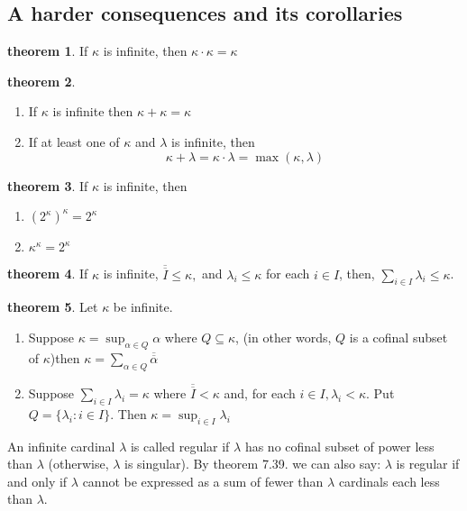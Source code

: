 \documentclass[a4paper,11pt]{article}%
\theoremstyle{remark}
\theoremstyle{definition}
\newtheorem{theorem}{theorem}[section]
\theoremstyle{definition}
\theoremstyle{plain}
\theoremstyle{definition}
\begin{document}
\subsection{A harder consequences and its corollaries}
\begin{theorem}
    If $\kappa$ is infinite, then $\kappa\cdot\kappa=\kappa$
\end{theorem}
\begin{theorem}
    \begin{enumerate}
        \item If $\kappa$ is infinite then $\kappa+\kappa=\kappa$
        \item If at least one of $\kappa$ and $\lambda$ is infinite, then
        \[\kappa+\lambda=\kappa\cdot\lambda=\max(\kappa,\lambda)\]
    \end{enumerate}
\end{theorem}
\begin{theorem}
    If $\kappa$ is infinite, then 
    \begin{enumerate}
        \item $(2^{\kappa})^{\kappa}=2^{\kappa}$
        \item $\kappa^{\kappa}=2^{\kappa}$
    \end{enumerate}
\end{theorem}
\begin{theorem}
    If $\kappa$ is infinite, $\overline{\overline{I}}\leq\kappa,$ and $\lambda_i\leq\kappa$
    for each $i\in I$, then, $\sum_{i\in I}\lambda_i\leq\kappa$.
\end{theorem}
\begin{theorem}
    Let $\kappa$ be infinite.
    \begin{enumerate}
        \item Suppose $\kappa=\sup_{\alpha\in Q}\alpha$ where $Q\subseteq\kappa$, (in other words, $Q$ is a cofinal subset of $\kappa$)then $\kappa=\sum_{\alpha\in Q}\overline{\overline{\alpha}}$
        \item Suppose $\sum_{i\in I}\lambda_i=\kappa$ where $\overline{\overline{I}}<\kappa$
        and, for each $i\in I,\lambda_i<\kappa.$ Put $Q=\{\lambda_i:i\in I\}$. Then $\kappa=\sup_{i\in I}\lambda_i$
    \end{enumerate}
\end{theorem}
An infinite cardinal $\lambda$ is called regular if $\lambda$ has no cofinal subset 
of power less than $\lambda$ (otherwise, $\lambda$ is singular).
By theorem 7.39. we can also say: $\lambda$ is regular if and only if $\lambda$
cannot be expressed as a sum of fewer than $\lambda$ cardinals each less than $\lambda$.
\end{document}
